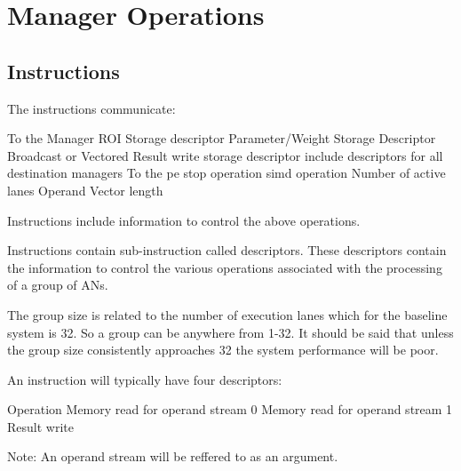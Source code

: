 \section{Manager Operations}
\label{sec:Manager Operations}

\subsection{Instructions}
\label{ssec:Instructions}
The instructions communicate:

\begin{outline}
        \1 To the Manager
            \2 ROI Storage descriptor
            \2 Parameter/Weight Storage Descriptor
                \3 Broadcast or Vectored
            \2 Result write storage descriptor
                \3 include descriptors for all destination managers
        \1 To the \ac{pe}
            \2 \ac{stop} operation
            \2 \ac{simd} operation
            \2 Number of active lanes
            \2 Operand Vector length
\end{outline}

Instructions include information to control the above operations.

Instructions contain sub-instruction called descriptors. These descriptors contain the information to control the various operations associated with the processing of a group of ANs.

The group size is related to the number of execution lanes which for the baseline system is 32. So a group can be anywhere from 1-32. It should be said that unless the group size consistently approaches 32 the system performance will be poor.

An instruction will typically have four descriptors:

\begin{outline}
\renewcommand{\outlinei}{enumerate}
    \1 Operation
    \1 Memory read for operand stream 0
    \1 Memory read for operand stream 1
    \1 Result write
\end{outline}

Note: An operand stream will be reffered to as an argument.

